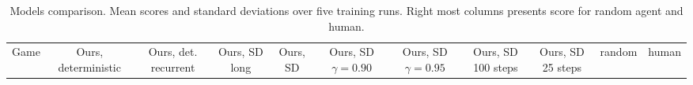 \begin{landscape}
\begin{changemargin}{0cm}{0cm}
\begin{center}

\vspace*{\fill}
\setlength{\tabcolsep}{4pt}
\begin{table}[!htbp]
\scriptsize
\caption{Models comparison. Mean scores and standard deviations over five training runs. Right most columns presents score for random agent and human.}
\begin{tabular}{lrlrlrlrlrlrlrlrlcc}

Game &          \multicolumn{2}{c}{Ours, deterministic}  &     \multicolumn{2}{c}{Ours, det. recurrent}   & \multicolumn{2}{c}{Ours, SD long} &     \multicolumn{2}{c}{Ours, SD} &     \multicolumn{2}{c}{Ours, SD $\gamma=0.90$}   &     \multicolumn{2}{c}{Ours, SD $\gamma=0.95$} &          \multicolumn{2}{c}{Ours, SD 100 steps}	&     \multicolumn{2}{c}{Ours, SD 25 steps} &		random &		human\\


\end{tabular}
\end{table}
\end{center}
\end{changemargin}
\end{landscape}
